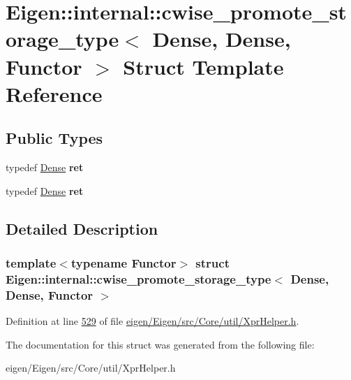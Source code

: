 \hypertarget{struct_eigen_1_1internal_1_1cwise__promote__storage__type_3_01_dense_00_01_dense_00_01_functor_01_4}{}\section{Eigen\+:\+:internal\+:\+:cwise\+\_\+promote\+\_\+storage\+\_\+type$<$ Dense, Dense, Functor $>$ Struct Template Reference}
\label{struct_eigen_1_1internal_1_1cwise__promote__storage__type_3_01_dense_00_01_dense_00_01_functor_01_4}
\subsection*{Public Types}
\begin{DoxyCompactItemize}
\item 
\mbox{\label{struct_eigen_1_1internal_1_1cwise__promote__storage__type_3_01_dense_00_01_dense_00_01_functor_01_4_a50e48bcebb52811d17225a868810466a}} 
typedef \hyperlink{struct_eigen_1_1_dense}{Dense} {\bfseries ret}
\item 
\mbox{\label{struct_eigen_1_1internal_1_1cwise__promote__storage__type_3_01_dense_00_01_dense_00_01_functor_01_4_a50e48bcebb52811d17225a868810466a}} 
typedef \hyperlink{struct_eigen_1_1_dense}{Dense} {\bfseries ret}
\end{DoxyCompactItemize}


\subsection{Detailed Description}
\subsubsection*{template$<$typename Functor$>$\newline
struct Eigen\+::internal\+::cwise\+\_\+promote\+\_\+storage\+\_\+type$<$ Dense, Dense, Functor $>$}



Definition at line \hyperlink{eigen_2_eigen_2src_2_core_2util_2_xpr_helper_8h_source_l00529}{529} of file \hyperlink{eigen_2_eigen_2src_2_core_2util_2_xpr_helper_8h_source}{eigen/\+Eigen/src/\+Core/util/\+Xpr\+Helper.\+h}.



The documentation for this struct was generated from the following file\+:\begin{DoxyCompactItemize}
\item 
eigen/\+Eigen/src/\+Core/util/\+Xpr\+Helper.\+h\end{DoxyCompactItemize}

